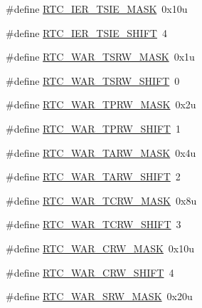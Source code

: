 \begin{DoxyCompactItemize}
\item 
\#define \hyperlink{group___r_t_c___register___masks_ga63c8ae5db82845d5bb13907cd0e70cd7}{R\+T\+C\+\_\+\+I\+E\+R\+\_\+\+T\+S\+I\+E\+\_\+\+M\+A\+SK}~0x10u
\item 
\#define \hyperlink{group___r_t_c___register___masks_ga456ec6fb31112c122b38dcc586d9e75d}{R\+T\+C\+\_\+\+I\+E\+R\+\_\+\+T\+S\+I\+E\+\_\+\+S\+H\+I\+FT}~4
\item 
\#define \hyperlink{group___r_t_c___register___masks_ga4a43de9885f5d7ec5888d140315f1c15}{R\+T\+C\+\_\+\+W\+A\+R\+\_\+\+T\+S\+R\+W\+\_\+\+M\+A\+SK}~0x1u
\item 
\#define \hyperlink{group___r_t_c___register___masks_gabf5ee77e5695cd42b86430a86ae7208e}{R\+T\+C\+\_\+\+W\+A\+R\+\_\+\+T\+S\+R\+W\+\_\+\+S\+H\+I\+FT}~0
\item 
\#define \hyperlink{group___r_t_c___register___masks_gae9b8d07cbb9d8d13e57c8428a6379a6d}{R\+T\+C\+\_\+\+W\+A\+R\+\_\+\+T\+P\+R\+W\+\_\+\+M\+A\+SK}~0x2u
\item 
\#define \hyperlink{group___r_t_c___register___masks_ga5d66e90fa47b893ca2cb08835954db3d}{R\+T\+C\+\_\+\+W\+A\+R\+\_\+\+T\+P\+R\+W\+\_\+\+S\+H\+I\+FT}~1
\item 
\#define \hyperlink{group___r_t_c___register___masks_gab38b8a6dbc68530394f37411f8ae53f9}{R\+T\+C\+\_\+\+W\+A\+R\+\_\+\+T\+A\+R\+W\+\_\+\+M\+A\+SK}~0x4u
\item 
\#define \hyperlink{group___r_t_c___register___masks_gafbed3610e58c464a444dd08dc972fdfa}{R\+T\+C\+\_\+\+W\+A\+R\+\_\+\+T\+A\+R\+W\+\_\+\+S\+H\+I\+FT}~2
\item 
\#define \hyperlink{group___r_t_c___register___masks_gac045d2cc3465abd70d67c1870bcbf72c}{R\+T\+C\+\_\+\+W\+A\+R\+\_\+\+T\+C\+R\+W\+\_\+\+M\+A\+SK}~0x8u
\item 
\#define \hyperlink{group___r_t_c___register___masks_ga3eb83cd01492902ca7ece89636fbbdf6}{R\+T\+C\+\_\+\+W\+A\+R\+\_\+\+T\+C\+R\+W\+\_\+\+S\+H\+I\+FT}~3
\item 
\#define \hyperlink{group___r_t_c___register___masks_ga7f2a7b622370e2141ea5dffe9e3a4d65}{R\+T\+C\+\_\+\+W\+A\+R\+\_\+\+C\+R\+W\+\_\+\+M\+A\+SK}~0x10u
\item 
\#define \hyperlink{group___r_t_c___register___masks_gac982942ab2487ce87ece3deb9b6b7442}{R\+T\+C\+\_\+\+W\+A\+R\+\_\+\+C\+R\+W\+\_\+\+S\+H\+I\+FT}~4
\item 
\#define \hyperlink{group___r_t_c___register___masks_ga4f0eed272734e6f9a37612ea5371c4c3}{R\+T\+C\+\_\+\+W\+A\+R\+\_\+\+S\+R\+W\+\_\+\+M\+A\+SK}~0x20u
\item 

\end{DoxyCompactItemize}
